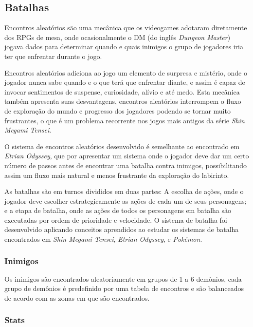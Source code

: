 \documentclass[
	12pt,				%
	openright,			%
	twoside,			%
	a4paper,			%
	english,			%
	french,				%
	spanish,			%
	brazil				%
	]{abntex2}
\begin{document}
\subsection{Batalhas}

Encontros aleatórios são uma mecânica que os videogames adotaram diretamente dos RPGs de mesa, onde ocasionalmente o DM (do inglês \emph{Dungeon Master}) jogava dados para determinar quando e quais inimigos o grupo de jogadores iria ter que enfrentar durante o jogo.

	Encontros aleatórios adiciona ao jogo um elemento de surpresa e mistério, onde o jogador nunca sabe quando e o que terá que enfrentar diante, e assim é capaz de invocar sentimentos de suspense, curiosidade, alívio e até medo. Esta mecânica também apresenta suas desvantagens, encontros aleatórios interrompem o fluxo de exploração do mundo e progresso dos jogadores podendo se tornar muito frustrantes, o que é um problema recorrente nos jogos mais antigos da série \emph{Shin Megami Tensei}. 

	O sistema de encontros aleatórios desenvolvido é semelhante ao encontrado em \emph{Etrian Odyssey}, que por apresentar um sistema onde o jogador deve dar um certo número de passos antes de encontrar uma batalha contra inimigos, possibilitando assim um fluxo mais natural e menos frustrante da exploração do labirinto. 

	As batalhas são em turnos divididos em duas partes: A escolha de ações, onde o jogador deve escolher estrategicamente as ações de cada um de seus personagens; e a etapa de batalha, onde as ações de todos os personagens em batalha são executadas por ordem de prioridade e velocidade. O sistema de batalha foi desenvolvido aplicando conceitos aprendidos ao estudar os sistemas de batalha encontrados em \emph{Shin Megami Tensei}, \emph{Etrian Odyssey}, e \emph{Pokémon}.

\subsubsection{Inimigos}

Os inimigos são encontrados aleatoriamente em grupos de 1 a 6 demônios, cada grupo de demônios é predefinido por uma tabela de encontros e são balanceados de acordo com as zonas em que são encontrados.

\subsubsection{Stats}
\end{document}
